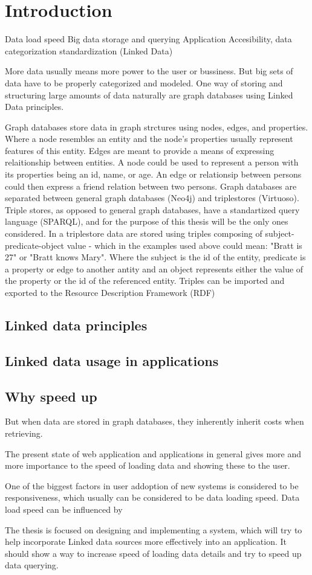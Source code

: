 \chapter{Introduction}
Data load speed
Big data storage and querying
Application Accesibility, data categorization standardization (Linked Data)

More data usually means more power to the user or bussiness. But big sets of data have to be properly categorized and modeled. One way of storing and structuring large amounts of data naturally are graph databases using Linked Data principles.

Graph databases store data in graph strctures using nodes, edges, and properties. Where a node resembles an entity and the node's properties usually represent features of this entity. Edges are meant to provide a means of expressing relaitionship between entities. A node could be used to represent a person with its properties being an id, name, or age. An edge or relationsip between persons could then express a friend relation between two persons. Graph databases are separated between general graph databases (Neo4j) and triplestores (Virtuoso). %
Triple stores, as opposed to general graph databases, have a standartized query language (SPARQL), and for the purpose of this thesis will be the only ones considered. In a triplestore data are stored using triples composing of subject-predicate-object value - which in the examples used above could mean: "Bratt is 27" or "Bratt knows Mary". Where the subject is the id of the entity, predicate is a property or edge to another antity and an object represents either the value of the property or the id of the referenced entity. Triples can be imported and exported to the Resource Description Framework (RDF)

\section{Linked data principles}


\section{Linked data usage in applications}

\section{Why speed up}
But when data are stored in graph databases, they inherently inherit costs when retrieving. 

The present state of web application and applications in general gives more and more importance to the speed of loading data and showing these to the user. 

One of the biggest factors in user addoption of new systems is considered to be responsiveness, which usually can be considered to be data loading speed. Data load speed can be influenced by 

The thesis is focused on designing and implementing a system, which will try to help incorporate Linked data sources more effectively into an application. It should show a way to increase speed of loading data details and try to speed up data querying.